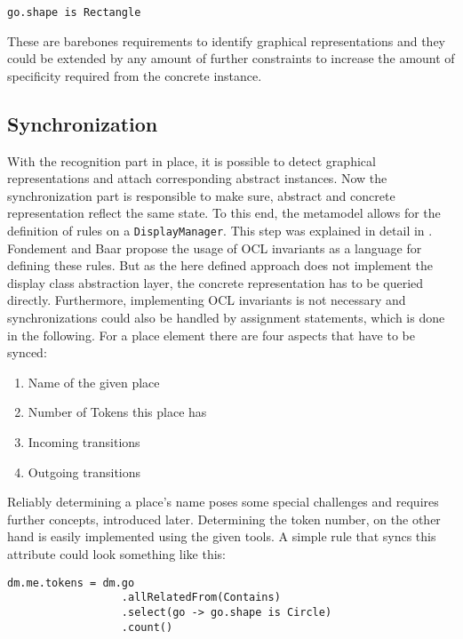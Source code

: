 \begin{lstlisting}[captionpos=b,caption={Simple constraint to check for transition representations},label={lst:transition-constraints}]
go.shape is Rectangle
\end{lstlisting}

These are barebones requirements to identify graphical representations and they could be extended by any amount of further constraints to increase the amount of specificity required from the concrete instance.

\subsection{Synchronization}
With the recognition part in place, it is possible to detect graphical representations and attach corresponding abstract instances. Now the synchronization part is responsible to make sure, abstract and concrete representation reflect the same state. To this end, the metamodel allows for the definition of rules on a \texttt{DisplayManager}. This step was explained in detail in \cite{fondement_making_2005}. Fondement and Baar propose the usage of OCL invariants as a language for defining these rules. But as the here defined approach does not implement the display class abstraction layer, the concrete representation has to be queried directly. Furthermore, implementing OCL invariants is not necessary and synchronizations could also be handled by assignment statements, which is done in the following. For a place element there are four aspects that have to be synced:

\begin{enumerate}
  \item Name of the given place
  \item Number of Tokens this place has
  \item Incoming transitions
  \item Outgoing transitions
\end{enumerate} 

Reliably determining a place's name poses some special challenges and requires further concepts, introduced later. Determining the token number, on the other hand is easily implemented using the given tools. A simple rule that syncs this attribute could look something like this:

\begin{lstlisting}[captionpos=b,caption={Rule that syncs the token count of a place element}]
dm.me.tokens = dm.go
                  .allRelatedFrom(Contains)
                  .select(go -> go.shape is Circle)
                  .count()
\end{lstlisting}

